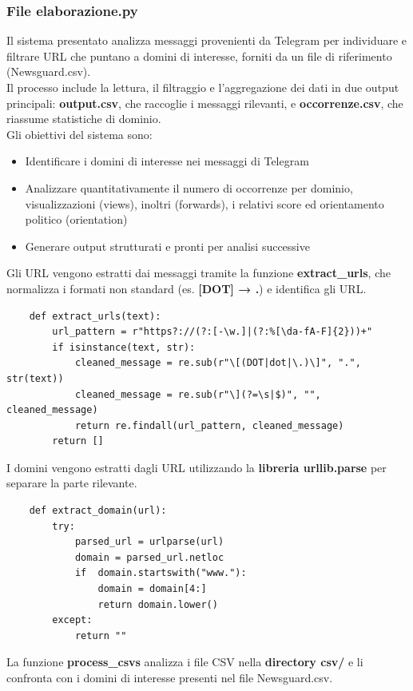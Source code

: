 \documentclass[12pt]{article}
\begin{document}
	\subsubsection{File elaborazione.py}
	Il sistema presentato analizza messaggi provenienti da Telegram per individuare e filtrare URL che puntano a domini di interesse, forniti da un file di riferimento (Newsguard.csv).\\
	Il processo include la lettura, il filtraggio e l'aggregazione dei dati in due output principali: \textbf{output.csv}, che raccoglie i messaggi rilevanti, e \textbf{occorrenze.csv}, che riassume statistiche di dominio.\\
	Gli obiettivi del sistema sono:
	\begin{itemize}[label=]
		\item Identificare i domini di interesse nei messaggi di Telegram
		\item Analizzare quantitativamente il numero di occorrenze per dominio, visualizzazioni (views), inoltri (forwards), i relativi score ed orientamento politico (orientation)
		\item Generare output strutturati e pronti per analisi successive
	\end{itemize}
	Gli URL vengono estratti dai messaggi tramite la funzione \textbf{extract\_urls}, che normalizza i formati non standard (es. \textbf{[DOT] → .}) e identifica gli URL.
	\begin{lstlisting}
	def extract_urls(text):
		url_pattern = r"https?://(?:[-\w.]|(?:%[\da-fA-F]{2}))+"
		if isinstance(text, str):
			cleaned_message = re.sub(r"\[(DOT|dot|\.)\]", ".", str(text))
			cleaned_message = re.sub(r"\](?=\s|$)", "", cleaned_message)
			return re.findall(url_pattern, cleaned_message)
		return []
	\end{lstlisting}
	I domini vengono estratti dagli URL utilizzando la \textbf{libreria urllib.parse} per separare la parte rilevante.
	\begin{lstlisting}
	def extract_domain(url):
		try:
			parsed_url = urlparse(url)
			domain = parsed_url.netloc
			if 	domain.startswith("www."):
				domain = domain[4:]
				return domain.lower()
		except:
			return ""
	\end{lstlisting}
	La funzione\textbf{ process\_csvs} analizza i file CSV nella \textbf{directory csv/} e li confronta con i domini di interesse presenti nel file Newsguard.csv.
\end{document}
